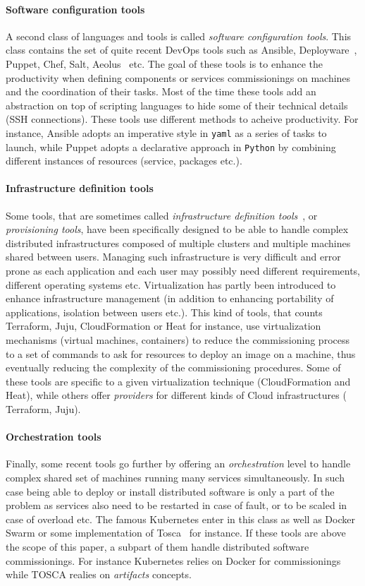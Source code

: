 \paragraph{Software configuration tools}
A second class of languages and tools is called \emph{software
  configuration tools}. This class contains the set of quite recent
DevOps tools such as Ansible, Deployware~\cite{}, Puppet, Chef, Salt,
Aeolus~\cite{} etc. The goal of these tools is to enhance the
productivity when defining components or services commissionings on
machines and the coordination of their tasks. Most of the time these
tools add an abstraction on top of scripting languages to hide some of
their technical details (\eg SSH connections). These tools use
different methods to acheive productivity. For instance, Ansible
adopts an imperative style in \texttt{yaml} as a series of tasks to
launch, while Puppet adopts a declarative approach in \texttt{Python}
by combining different instances of resources (\ie service, packages
etc.).

\paragraph{Infrastructure definition tools}
Some tools, that are sometimes called \emph{infrastructure definition
  tools}~\cite{}, or \emph{provisioning tools}, have been specifically
designed to be able to handle complex distributed infrastructures
composed of multiple clusters and multiple machines shared between
users. Managing such infrastructure is very difficult and error prone
as each application and each user may possibly need different
requirements, different operating systems etc. Virtualization has
partly been introduced to enhance infrastructure management (in
addition to enhancing portability of applications, isolation between
users etc.). This kind of tools, that counts Terraform, Juju,
CloudFormation or Heat for instance, use virtualization mechanisms
(\eg virtual machines, containers) to reduce the commissioning process
to a set of commands to ask for resources to deploy an image on a
machine, thus eventually reducing the complexity of the commissioning
procedures. Some of these tools are specific to a given virtualization
technique (\eg CloudFormation and Heat), while others offer
\emph{providers} for different kinds of Cloud infrastructures (\eg
Terraform, Juju).

\paragraph{Orchestration tools}
Finally, some recent tools go further by offering an
\emph{orchestration} level to handle complex shared set of machines
running many services simultaneously. In such case being able to
deploy or install distributed software is only a part of the problem
as services also need to be restarted in case of fault, or to be
scaled in case of overload etc. The famous Kubernetes enter in this
class as well as Docker Swarm or some implementation of Tosca~\cite{}
for instance. If these tools are above the scope of this paper, a
subpart of them handle distributed software commissionings. For
instance Kubernetes relies on Docker for commissionings while TOSCA
realies on \emph{artifacts} concepts.

